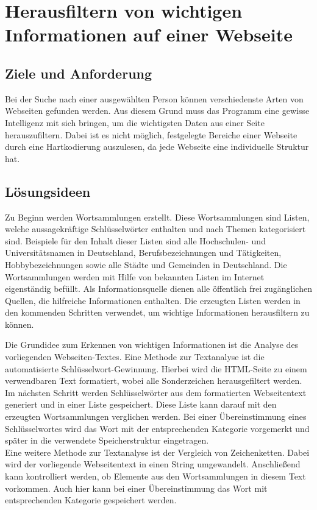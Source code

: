 \section{Herausfiltern von wichtigen Informationen auf einer Webseite}
	\subsection{Ziele und Anforderung}
	Bei der Suche nach einer ausgewählten Person können verschiedenste Arten von Webseiten gefunden werden. Aus diesem Grund muss das Programm eine gewisse Intelligenz mit sich bringen, um die wichtigsten Daten aus einer Seite herauszufiltern. Dabei ist es nicht möglich, festgelegte Bereiche einer Webseite durch eine Hartkodierung auszulesen, da jede Webseite eine individuelle Struktur hat.
	\subsection{Lösungsideen}
	\label{subsec:ErkennenVonInformation}	
	Zu Beginn werden Wortsammlungen erstellt. Diese Wortsammlungen sind Listen, welche aussagekräftige Schlüsselwörter enthalten und nach Themen kategorisiert sind. Beispiele für den Inhalt dieser Listen sind alle Hochschulen- und Universitätsnamen in Deutschland, Berufsbezeichnungen und Tätigkeiten, Hobbybezeichnungen sowie alle Städte und Gemeinden in Deutschland. Die Wortsammlungen werden mit Hilfe von bekannten Listen im Internet eigenständig befüllt. Als Informationsquelle dienen alle öffentlich frei zugänglichen Quellen, die hilfreiche Informationen enthalten. Die erzeugten Listen werden in den kommenden Schritten verwendet, um wichtige Informationen herausfiltern zu können.
	
	Die Grundidee zum Erkennen von wichtigen Informationen ist die Analyse des vorliegenden Webseiten-Textes. Eine Methode zur Textanalyse ist die automatisierte Schlüsselwort-Gewinnung. Hierbei wird die HTML-Seite zu einem verwendbaren Text formatiert, wobei alle Sonderzeichen herausgefiltert werden. Im nächsten Schritt werden Schlüsselwörter aus dem formatierten Webseitentext generiert und in einer Liste gespeichert. Diese Liste kann darauf mit den erzeugten Wortsammlungen verglichen werden. Bei einer Übereinstimmung eines Schlüsselwortes wird das Wort mit der entsprechenden Kategorie vorgemerkt und später in die verwendete Speicherstruktur eingetragen.\\
	Eine weitere Methode zur Textanalyse ist der Vergleich von Zeichenketten. Dabei wird der vorliegende Webseitentext in einen String umgewandelt. Anschließend kann kontrolliert werden, ob Elemente aus den Wortsammlungen in diesem Text vorkommen. Auch hier kann bei einer Übereinstimmung das Wort mit entsprechenden Kategorie gespeichert werden.
	
